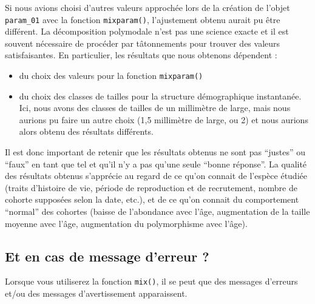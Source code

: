 \documentclass[
  a4paper,
  DIV=11,
  numbers=noendperiod,
  oneside]{scrreprt}
\providecommand{\tightlist}{%
  \setlength{\itemsep}{0pt}\setlength{\parskip}{0pt}}\usepackage{longtable,booktabs,array}
\begin{document}
\begin{tcolorbox}[enhanced jigsaw, toprule=.15mm, coltitle=black, colframe=quarto-callout-important-color-frame, titlerule=0mm, leftrule=.75mm, opacityback=0, bottomrule=.15mm, title=\textcolor{quarto-callout-important-color}{\faExclamation}\hspace{0.5em}{De l'importance du choix des valeurs initiales}, colbacktitle=quarto-callout-important-color!10!white, breakable, colback=white, left=2mm, toptitle=1mm, arc=.35mm, bottomtitle=1mm, rightrule=.15mm, opacitybacktitle=0.6]
Si nous avions choisi d'autres valeurs approchée lors de la création de
l'objet \texttt{param\_01} avec la fonction \texttt{mixparam()},
l'ajustement obtenu aurait pu être différent. La décomposition
polymodale n'est pas une science exacte et il est souvent nécessaire de
procéder par tâtonnements pour trouver des valeurs satisfaisantes. En
particulier, les résultats que nous obtenons dépendent :

\begin{itemize}
\tightlist
\item
  du choix des valeurs pour la fonction \texttt{mixparam()}
\item
  du choix des classes de tailles pour la structure démographique
  instantanée. Ici, nous avons des classes de tailles de un millimètre
  de large, mais nous aurions pu faire un autre choix (1,5 millimètre de
  large, ou 2) et nous aurions alors obtenu des résultats différents.
\end{itemize}

Il est donc important de retenir que les résultats obtenus ne sont pas
``justes'' ou ``faux'' en tant que tel et qu'il n'y a pas qu'une seule
``bonne réponse''. La qualité des résultats obtenus s'apprécie au regard
de ce qu'on connait de l'espèce étudiée (traits d'histoire de vie,
période de reproduction et de recrutement, nombre de cohorte supposées
selon la date, etc.), et de ce qu'on connait du comportement ``normal''
des cohortes (baisse de l'abondance avec l'âge, augmentation de la
taille moyenne avec l'âge, augmentation du polymorphisme avec l'âge).
\end{tcolorbox}

\hypertarget{et-en-cas-de-message-derreur}{%
\subsection{Et en cas de message d'erreur
?}\label{et-en-cas-de-message-derreur}}

Lorsque vous utiliserez la fonction \texttt{mix()}, il se peut que des
messages d'erreurs et/ou des messages d'avertissement apparaissent.
\end{document}
